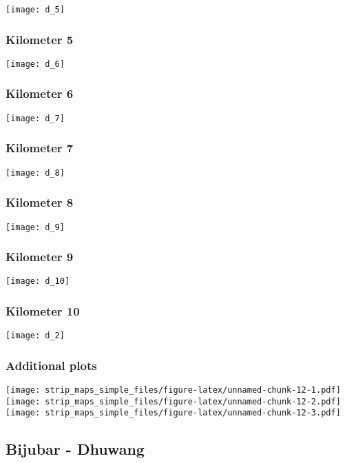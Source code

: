 \documentclass[]{article}
\begin{document}
\texttt{[image: d\_5]}

\subsubsection{Kilometer 5}\label{kilometer-5-3}

\texttt{[image: d\_6]}

\subsubsection{Kilometer 6}\label{kilometer-6-3}

\texttt{[image: d\_7]}

\subsubsection{Kilometer 7}\label{kilometer-7-3}

\texttt{[image: d\_8]}

\subsubsection{Kilometer 8}\label{kilometer-8-3}

\texttt{[image: d\_9]}

\subsubsection{Kilometer 9}\label{kilometer-9-2}

\texttt{[image: d\_10]}

\subsubsection{Kilometer 10}\label{kilometer-10-2}

\texttt{[image: d\_2]}

\subsubsection{Additional plots}\label{additional-plots-3}

\texttt{[image: strip\_maps\_simple\_files/figure-latex/unnamed-chunk-12-1.pdf]}
\texttt{[image: strip\_maps\_simple\_files/figure-latex/unnamed-chunk-12-2.pdf]}
\texttt{[image: strip\_maps\_simple\_files/figure-latex/unnamed-chunk-12-3.pdf]}

\newpage

\subsection{Bijubar - Dhuwang}\label{bijubar---dhuwang}
\end{document}
